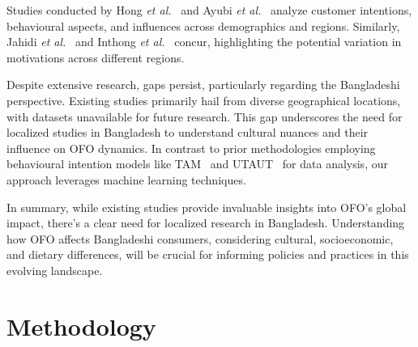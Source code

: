 \documentclass[a4paper,fleqn]{cas-sc}
\newcommand{\etal}{\textit{et al.}}
\begin{document}
Studies conducted by Hong \etal~\cite{hong_2021} and Ayubi \etal~\cite{ayubi_2021} analyze customer intentions, behavioural aspects, and influences across demographics and regions. Similarly, Jahidi \etal~\cite{jahidi_2022} and Inthong \etal~\cite{inthong_2022} concur, highlighting the potential variation in motivations across different regions.

Despite extensive research, gaps persist, particularly regarding the Bangladeshi perspective. Existing studies primarily hail from diverse geographical locations, with datasets unavailable for future research. This gap underscores the need for localized studies in Bangladesh to understand cultural nuances and their influence on OFO dynamics. In contrast to prior methodologies employing behavioural intention models like TAM~\cite{tam} and UTAUT~\cite{utaut} for data analysis, our approach leverages machine learning techniques.

In summary, while existing studies provide invaluable insights into OFO's global impact, there's a clear need for localized research in Bangladesh. Understanding how OFO affects Bangladeshi consumers, considering cultural, socioeconomic, and dietary differences, will be crucial for informing policies and practices in this evolving landscape.

\section{Methodology}
\end{document}
